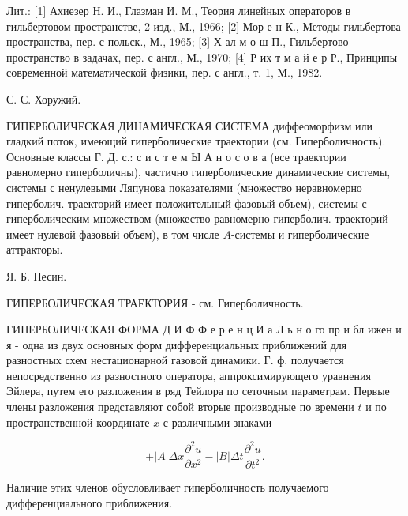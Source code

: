 \documentclass[10pt]{article}
\begin{document}
Лит.: [1] Ахиезер Н. И., Глазман И. М., Теория линейных операторов в гильбертовом пространстве, 2 изд., М., 1966; [2] Мор е н К., Методы гильбертова пространства, пер. с польск., М., 1965; [3] Х ал м о ш П., Гильбертово пространство в задачах, пер. с англ., М., 1970; [4] Р их т м а й е р Р., Принципы современной математической физики, пер. с англ., т. 1, М., 1982.



С. С. Хоружий.



ГИПЕРБОЛИЧЕСКАЯ ДИНАМИЧЕСКАЯ СИСТЕМА диффеоморфизм или гладкий поток, имеющий гиперболические траектории (см. Гиперболичность). Основные классы Г. Д. с.: с и с т е м Ы А н о с о в а (все траектории равномерно гиперболичны), частично гиперболические динамические системы, системы с ненулевыми Ляпунова показателями (множество неравномерно гиперболич. траекторий имеет положительный фазовый объем), системы с гиперболическим множеством (множество равномерно гиперболич. траекторий имеет нулевой фазовый объем), в том числе $A$-системы и гиперболические аттракторы.



Я. Б. Песин.



ГИПЕРБОЛИЧЕСКАЯ ТРАЕКТОРИЯ - см. Гиперболичность.



ГИПЕРБОЛИЧЕСКАЯ ФОРМА Д И Ф Ф е р е н ц И а Л ь н о го пр и бл ижен и я - одна из двух основных форм дифференциальных приближений для разностных схем нестационарной газовой динамики. Г. ф. получается непосредственно из разностного оператора, аппроксимирующего уравнения Эйлера, путем его разложения в ряд Тейлора по сеточным параметрам. Первые члены разложения представляют собой вторые производные по времени $t$ и по пространственной координате $x$ с различными знаками



\[

+|A| \Delta x \frac{\partial^{2} u}{\partial x^{2}}-|B| \Delta t \frac{\partial^{2} u}{\partial t^{2}} .

\]



Наличие этих членов обусловливает гиперболичность получаемого дифференциального приближения.
\end{document}
